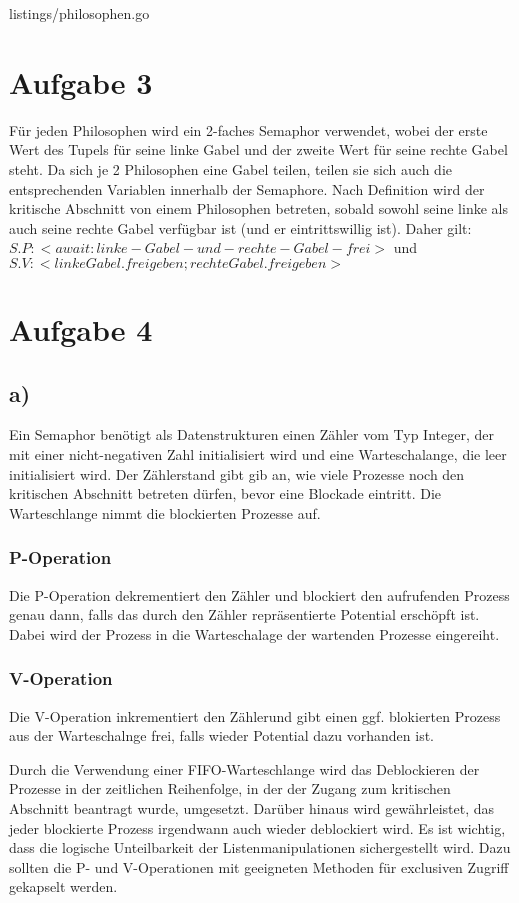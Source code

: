 \documentclass[11pt,a4paper,DIV=10,]{scrartcl}
\begin{document}

{listings/philosophen.go}
\section*{Aufgabe 3}

Für jeden Philosophen wird ein 2-faches Semaphor verwendet, wobei der erste Wert des Tupels für seine linke Gabel und der zweite Wert für seine rechte Gabel steht.  Da sich je 2 Philosophen eine Gabel teilen, teilen sie sich auch die entsprechenden Variablen innerhalb der Semaphore. Nach Definition wird der kritische Abschnitt von einem Philosophen betreten, sobald sowohl seine linke als auch seine rechte Gabel verfügbar ist (und er eintrittswillig ist). Daher gilt: $S.P: < await: linke-Gabel-und-rechte-Gabel-frei> $ und $S.V: <linkeGabel.freigeben; rechteGabel.freigeben>$
\section*{Aufgabe 4}
\subsection*{a)}
Ein Semaphor benötigt als Datenstrukturen einen Zähler vom Typ Integer, der mit einer nicht-negativen Zahl initialisiert wird und eine Warteschalange, die leer initialisiert wird. Der Zählerstand gibt gib an, wie viele Prozesse noch den kritischen Abschnitt betreten dürfen, bevor eine Blockade eintritt. Die Warteschlange nimmt die blockierten Prozesse auf.
\subsubsection*{P-Operation}
Die P-Operation dekrementiert den Zähler und blockiert den aufrufenden Prozess genau dann, falls das durch den Zähler repräsentierte Potential erschöpft ist. Dabei wird der Prozess in die Warteschalage der wartenden Prozesse eingereiht.
\subsubsection*{V-Operation}
Die V-Operation inkrementiert den Zählerund gibt einen ggf. blokierten Prozess aus der Warteschalnge frei, falls wieder Potential dazu vorhanden ist.

Durch die Verwendung einer FIFO-Warteschlange wird das Deblockieren der Prozesse in der zeitlichen Reihenfolge, in der der Zugang zum kritischen Abschnitt beantragt wurde, umgesetzt. Darüber hinaus wird gewährleistet, das jeder blockierte Prozess irgendwann auch wieder deblockiert wird. Es ist wichtig, dass die logische Unteilbarkeit der Listenmanipulationen sichergestellt wird. Dazu sollten die P- und V-Operationen mit geeigneten Methoden für exclusiven Zugriff gekapselt werden.
\end{document}
